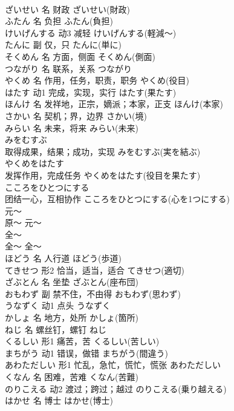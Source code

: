 \documentclass[8pt]{extreport}
\begin{document}
\begin{CJK}{UTF8}{min}
\\	ざいせい	名	财政	ざいせい(財政)	
\\	ふたん	名	负担	ふたん(負担)	
\\	けいげんする	动3	减轻	けいげんする(軽減～)	
\\	たんに	副	仅，只	たんに(単に)	
\\	そくめん	名	方面，侧面	そくめん(側面)	
\\	つながり	名	联系，关系	つながり	
\\	やくめ	名	作用，任务，职责，职务	やくめ(役目)	
\\	はたす	动1	完成，实现，实行	はたす(果たす)	
\\	ほんけ	名	发祥地，正宗，嫡派；本家，正支	ほんけ(本家)	
\\	さかい	名	契机；界，边界	さかい(境)	
\\	みらい	名	未来，将来	みらい(未来)	
\\	みをむすぶ	
\\	取得成果，结果；成功，实现	みをむすぶ(実を結ぶ)	
\\	やくめをはたす	
\\	发挥作用，完成任务	やくめをはたす(役目を果たす)	
\\	こころをひとつにする	
\\	团结一心，互相协作	こころをひとつにする(心を1つにする)	
\\	元～	
\\	原～	元～	
\\	全～	
\\	全～	全～	
\\	ほどう	名	人行道	ほどう(歩道)	
\\	てきせつ	形2	恰当，适当，适合	てきせつ(適切)	
\\	ざぶとん	名	坐垫	ざぶとん(座布団)	
\\	おもわず	副	禁不住，不由得	おもわず(思わず)	
\\	うなずく	动1	点头	うなずく	
\\	かしょ	名	地方，处所	かしょ(箇所)	
\\	ねじ	名	螺丝钉，螺钉	ねじ	
\\	くるしい	形1	痛苦，苦	くるしい(苦しい)	
\\	まちがう	动1	错误，做错	まちがう(間違う)	
\\	あわただしい	形1	忙乱，急忙，慌忙，慌张	あわただしい	
\\	くなん	名	困难，苦难	くなん(苦難)	
\\	のりこえる	动2	渡过；跨过；越过	のりこえる(乗り越える)	
\\	はかせ	名	博士	はかせ(博士)	

\end{CJK}
\end{document}
